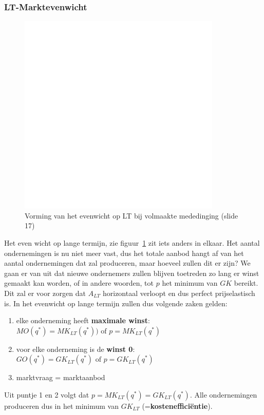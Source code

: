 \subsubsection{LT-Marktevenwicht}

\begin{figure}[htbp]
   \centering
   \includegraphics[scale=0.4]{Images/white.png}
   \caption{Vorming van het evenwicht op LT bij volmaakte mededinging (slide 17)}
   \label{fig:evenwichtLTVM}
\end{figure}

Het even wicht op lange termijn, zie figuur~\ref{fig:evenwichtLTVM} zit iets anders in elkaar. Het aantal ondernemingen is nu niet meer vast, dus het totale aanbod hangt af van het aantal ondernemingen dat zal produceren, maar hoeveel zullen dit er zijn? We gaan er van uit dat nieuwe ondernemers zullen blijven toetreden zo lang er winst gemaakt kan worden, of in andere woorden, tot $p$ het minimum van $GK$ bereikt. Dit zal er voor zorgen dat $A_{LT}$ horizontaal verloopt en dus perfect prijselastisch is. In het evenwicht op lange termijn zullen dus volgende zaken gelden:
\begin{enumerate}
   \item elke onderneming heeft \textbf{maximale winst}: $MO(q^*) = MK_{LT}(q^*)) \text{ of } p = MK_{LT}(q^*)$
   \item voor elke onderneming is de \textbf{winst 0}: $GO(q^*) = GK_{LT}(q^*) \text{ of } p = GK_{LT}(q^*)$
   \item marktvraag = marktaanbod
\end{enumerate}
Uit puntje 1 en 2 volgt dat $p = MK_{LT}(q^*) = GK_{LT}(q^*)$. Alle ondernemingen produceren dus in het minimum van $GK_{LT}$ (=\textbf{kosteneffici\"entie}).

